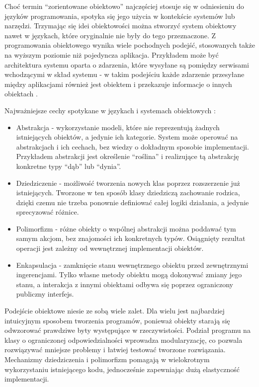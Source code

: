 \documentclass[a4paper,twoside,12pt]{book}
\begin{document}
Choć termin ``zorientowane obiektowo'' najczęściej stosuje się w odniesieniu do języków programowania, spotyka się jego użycia w kontekście systemów lub narzędzi. Trzymając się idei obiektowości można stworzyć system obiektowy nawet w językach, które oryginalnie nie były do tego przeznaczone. Z programowania obiektowego wynika wiele pochodnych podejść, stosowanych także na wyższym poziomie niż pojedyncza aplikacja. Przykładem może być architektura systemu oparta o zdarzenia, które wysyłane są pomiędzy serwisami wchodzącymi w skład systemu - w takim podejściu każde zdarzenie przesyłane między aplikacjami również jest obiektem i przekazuje informacje o innych obiektach \cite{bib:event-driven-microservices}.

Najważniejsze cechy spotykane w językach i systemach obiektowych \cite{bib:programowanie-zorientowane-obiektowo}:
\begin{itemize}
    \item Abstrakcja - wykorzystanie modeli, które nie reprezentują żadnych istniejących obiektów, a jedynie ich kategorie. System może operować na abstrakcjach i ich cechach, bez wiedzy o dokładnym sposobie implementacji. Przykładem abstrakcji jest określenie ``roślina'' i realizujące tą abstrakcję konkretne typy ``dąb'' lub ``dynia''. 
    \item Dziedziczenie - możliwość tworzenia nowych klas poprzez rozszerzenie już istniejących. Tworzone w ten sposób klasy dziedziczą zachowanie rodzica, dzięki czemu nie trzeba ponownie definiować całej logiki działania, a jedynie sprecyzować różnice.
    \item Polimorfizm - różne obiekty o wspólnej abstrakcji można poddawać tym samym akcjom, bez znajomości ich konkretnych typów. Osiągnięty rezultat operacji jest zależny od wewnętrznej implementacji obiektów.
    \item Enkapsulacja - zamknięcie stanu wewnętrznego obiektu przed zewnętrznymi ingerencjami. Tylko własne metody obiektu mogą dokonywać zmiany jego stanu, a interakcja z innymi obiektami odbywa się poprzez ograniczony publiczny interfejs.
\end{itemize}

Podejście obiektowe niesie ze sobą wiele zalet. Dla wielu jest najbardziej intuicyjnym sposobem tworzenia programów, ponieważ obiekty starają się odwzorować prawdziwe byty występujące w rzeczywistości. Podział programu na klasy o ograniczonej odpowiedzialności wprowadza modularyzację, co pozwala rozwiązywać mniejsze problemy i łatwiej testować tworzone rozwiązania. Mechanizmy dziedziczenia i polimorfizm pomagają w wielokrotnym wykorzystaniu istniejącego kodu, jednocześnie zapewniając dużą elastyczność implementacji.
\end{document}
